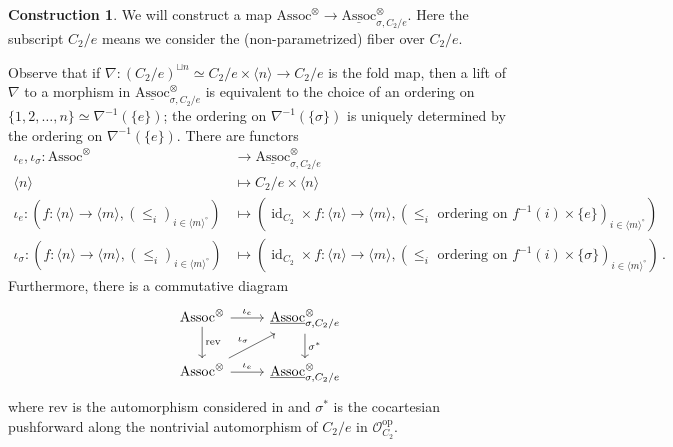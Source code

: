 \documentclass{article}
\DeclareMathOperator{\id}{id} %
\newcommand{\op}{\mathrm{op}}
\newcommand{\Assoc}{\mathrm{Assoc}}
\theoremstyle{definition}
\newtheorem{construction}[equation]{Construction}
\begin{document}
\begin{construction}
    We will construct a map $ \Assoc^\otimes \to \underline{\Assoc}^\otimes_{\sigma, C_2/e} $. 
    Here the subscript $ C_2/e $ means we consider the (non-parametrized) fiber over $ C_2/e $. 

    Observe that if $ \nabla \colon (C_2/e)^{\sqcup n} \simeq C_2/e \times \langle n \rangle \to C_2/e $ is the fold map, then a lift of $ \nabla $ to a morphism in $ \underline{\Assoc}^\otimes_{\sigma, C_2/e} $ is equivalent to the choice of an ordering on $ \{1,2, \ldots, n\} \simeq \nabla^{-1}(\{e\}) $; the ordering on $ \nabla^{-1}(\{\sigma\}) $ is uniquely determined by the ordering on $ \nabla^{-1}(\{e\}) $. 
    There are functors
    \begin{equation*}
    \begin{split}
        \iota_e, \iota_\sigma \colon \Assoc^\otimes &\to \underline{\Assoc}^\otimes_{\sigma, C_2/e} \\
        \langle n \rangle &\mapsto C_2/e \times \langle n \rangle \\
        \iota_e \colon \left(f \colon \langle n \rangle \to \langle m \rangle, (\leq_i)_{i \in \langle m \rangle^\circ}\right) & \mapsto \left(\id_{C_2} \times f \colon \langle n \rangle \to \langle m \rangle, (\leq_i \text{ ordering on }f^{-1}(i) \times \{e\})_{i \in \langle m \rangle^\circ}\right) \\
        \iota_\sigma \colon \left(f \colon \langle n \rangle \to \langle m \rangle, (\leq_i)_{i \in \langle m \rangle^\circ}\right) & \mapsto \left(\id_{C_2} \times f \colon \langle n \rangle \to \langle m \rangle, (\leq_i \text{ ordering on }f^{-1}(i) \times \{\sigma\})_{i \in \langle m \rangle^\circ}\right) \,.
    \end{split}
    \end{equation*} 
    Furthermore, there is a commutative diagram
    \begin{equation}
    \begin{tikzcd}
        \Assoc^\otimes \ar[d,"{\mathrm{rev}}"] \ar[r,"{\iota_e}"] & \underline{\Assoc}^\otimes_{\sigma, C_2/e} \ar[d,"{\sigma^*}"] \\
        \Assoc^\otimes \ar[r,"{\iota_e}"] \ar[ru,"{\iota_\sigma}"] & \underline{\Assoc}^\otimes_{\sigma, C_2/e}
    \end{tikzcd}
    \end{equation} 
    where $ \mathrm{rev} $ is the automorphism considered in \cite[Remark 4.1.1.7]{LurHA} and $ \sigma^* $ is the cocartesian pushforward along the nontrivial automorphism of $ C_2/e $ in $ \mathcal{O}_{C_2}^\op $. 

\end{construction}
\end{document}

